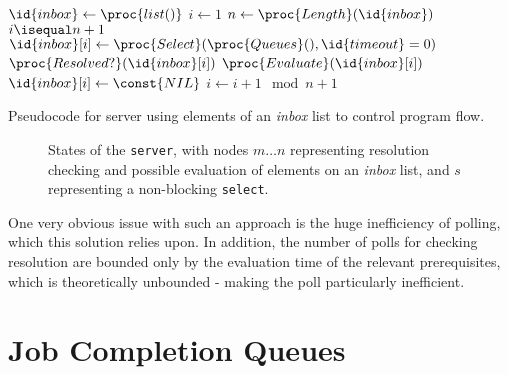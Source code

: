 \documentclass[a4paper,10pt]{article}
\begin{document}
\begin{lstclrs}
\begin{codebox}
	\li \(\id{inbox} \gets \proc{list()}\)
	\li \(i \gets 1\)
	\li \Repeat
	\li \(n \gets \proc{Length}(\id{inbox})\)
	\li \If \(i \isequal n + 1\)
	\li \Then
	\(\id{inbox}[i] \gets \proc{Select}(\proc{Queues}(), \id{timeout}=0)\)
	\End
	\li \If \(\proc{Resolved?}(\id{inbox}[i])\)
	\li \Then
	\(\proc{Evaluate}(\id{inbox}[i])\)
	\li \(\id{inbox}[i] \gets \const{NIL}\)
	\End
	\li \(i \gets i + 1 \mod n + 1\)
	\End
\end{codebox}
	\caption{\label{lst:q-state}Pseudocode for server using elements of an
	\textit{inbox} list to control program flow.}
\end{lstclrs}

\begin{figure}
	\centering
	\caption{\label{fig:q-state}States of the \texttt{server}, with nodes
	\(m \dots n\) representing resolution checking and possible evaluation
	of elements on an \textit{inbox} list, and \(s\) representing a
	non-blocking \texttt{select}.}
\end{figure}

One very obvious issue with such an approach is the huge inefficiency of
polling, which this solution relies upon.
In addition, the number of polls for checking resolution are bounded only by
the evaluation time of the relevant prerequisites, which is theoretically
unbounded - making the poll particularly inefficient.

\section{Job Completion Queues}
\end{document}
